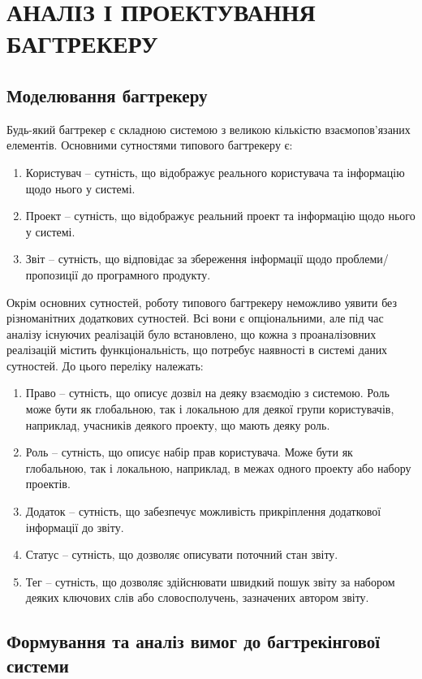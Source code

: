 \documentclass[../main.tex]{subfiles}
\begin{document}
\chapter{АНАЛІЗ І ПРОЕКТУВАННЯ БАГТРЕКЕРУ}

\section{Моделювання багтрекеру}

	Будь-який багтрекер є складною системою з великою кількістю взаємопов'язаних елементів. Основними сутностями типового багтрекеру є:
	\begin{enumerate}
		\item Користувач -- сутність, що відображує реального користувача та інформацію щодо нього у системі.
		\item Проект -- сутність, що відображує реальний проект та інформацію щодо нього у системі.
		\item Звіт -- сутність, що відповідає за збереження інформації щодо проблеми/пропозиції до програмного продукту.
	\end{enumerate}
	
	Окрім основних сутностей, роботу типового багтрекеру неможливо уявити без різноманітних додаткових сутностей. Всі вони є опціональними, але під час аналізу існуючих реалізацій було встановлено, що кожна з проаналізовних реалізацій містить функціональність, що потребує наявності в системі даних сутностей. До цього переліку належать:
	\begin{enumerate}
		\item Право -- сутність, що описує дозвіл на деяку взаємодію з системою. Роль може бути як глобальною, так і локальною для деякої групи користувачів, наприклад, учасників деякого проекту, що мають деяку роль.
		\item Роль -- сутність, що описує набір прав користувача. Може бути як глобальною, так і локальною, наприклад, в межах одного проекту або набору проектів.
		\item Додаток -- сутність, що забезпечує можливість прикріплення додаткової інформації до звіту.
		\item Статус -- сутність, що дозволяє описувати поточний стан звіту.
		\item Тег -- сутність, що дозволяє здійснювати швидкий пошук звіту за набором деяких ключових слів або словосполучень, зазначених автором звіту.
	\end{enumerate}

\section{Формування та аналіз вимог до багтрекінгової системи}
\end{document}
